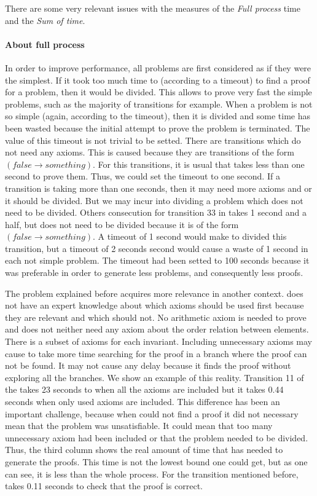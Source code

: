 There are some very relevant issues with the measures of the \textit{Full process} time and the \textit{Sum of \spass time}.

\paragraph{About full process}
In order to improve performance, all \spass problems are first considered as if they were the simplest. 
%
If it took too much time to \spass (according to a timeout) to find a proof for a problem, then it would be divided.
%
This allows to prove very fast the simple problems, such as the majority of \invDisj transitions for example. 
%
When a problem is not so simple (again, according to the timeout), then it is divided and some time has been wasted because the initial attempt to prove the problem is terminated.
%
The value of this timeout is not trivial to be setted.
%
There are transitions which do not need any axioms. 
%
This is caused because they are transitions of the form $(false \to something)$.
%
For this transitions, it is usual that \spass takes less than one second to prove them. 
%
Thus, we could set the timeout to one second. 
%
If a transition is taking more than one seconds, then it may need more axioms and or it should be divided.
%
But we may incur into dividing a problem which does not need to be divided. 
%
Others consecution for transition 33 in \lockInv takes 1 second and a half, but does not need to be divided because it is of the form $(false \to something)$.
%
A timeout of 1 second would make \gandalf to divided this transition, but a timeout of 2 seconds second would cause a waste of 1 second in each not simple \spass problem.
%
The timeout had been setted to 100 seconds because it was preferable in order to generate less \spass problems, and consequently less proofs.

The problem explained before acquires more relevance in another context.
%
\spass does not have an expert knowledge about which axioms should be used first because they are relevant and which should not.
%
No arithmetic axiom is needed to prove \invRegion and \spass does not neither need any axiom about the order relation between elements. 
%
There is a subset of axioms for each invariant.
%
Including unnecessary axioms may cause \spass to take more time searching for the proof in a branch where the proof can not be found. 
%
It may not cause any delay because it finds the proof without exploring all the branches.
%
We show an example of this reality.
%
Transition 11 of the \invPreserve takes 23 seconds to \spass when all the axioms are included but it takes 0.44 seconds when only used axioms are included. 
%
This difference has been an important challenge, because when \spass could not find a proof it did not necessary mean that the problem was unsatisfiable. 
%
It could mean that too many unnecessary axiom had been included or that the problem needed to be divided.
%
Thus, the third column shows the real amount of time that \spass has needed to generate the proofs. 
%
This time is not the lowest bound one could get, but as one can see, it is less than the whole process.
%
For the transition mentioned before, \spass takes 0.11 seconds to check that the proof is correct.
